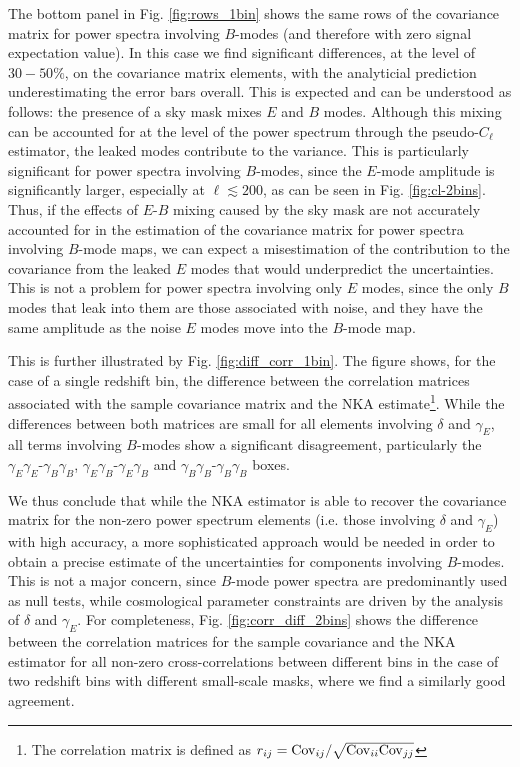 \documentclass[a4paper,11pt]{article}
\begin{document}
      The bottom panel in Fig. \ref{fig:rows_1bin} shows the same rows of the covariance matrix for power spectra involving $B$-modes (and therefore with zero signal expectation value). In this case we find significant differences, at the level of $30-50\%$, on the covariance matrix elements, with the analyticial prediction underestimating the error bars overall. This is expected and can be understood as follows: the presence of a sky mask mixes $E$ and $B$ modes. Although this mixing can be accounted for at the level of the power spectrum through the pseudo-$C_\ell$ estimator, the leaked modes contribute to the variance. This is particularly significant for power spectra involving $B$-modes, since the $E$-mode amplitude is significantly larger, especially at $\ell\lesssim200$, as can be seen in Fig. \ref{fig:cl-2bins}. Thus, if the effects of $E$-$B$ mixing caused by the sky mask are not accurately accounted for in the estimation of the covariance matrix for power spectra involving $B$-mode maps, we can expect a misestimation of the contribution to the covariance from the leaked $E$ modes that would underpredict the uncertainties. This is not a problem for power spectra involving only $E$ modes, since the only $B$ modes that leak into them are those associated with noise, and they have the same amplitude as the noise $E$ modes move into the $B$-mode map.

      This is further illustrated by Fig. \ref{fig:diff_corr_1bin}. The figure shows, for the case of a single redshift bin, the difference between the correlation matrices associated with the sample covariance matrix and the NKA estimate\footnote{The correlation matrix is defined as $r_{ij} = {\rm Cov}_{ij}/\sqrt{{\rm Cov}_{ii}{\rm Cov}_{jj}}$}. While the differences between both matrices are small for all elements involving $\delta$ and $\gamma_E$, all terms involving $B$-modes show a significant disagreement, particularly the  $\gamma_E\gamma_E$-$\gamma_B\gamma_B$, $\gamma_E\gamma_B$-$\gamma_E\gamma_B$ and $\gamma_B\gamma_B$-$\gamma_B\gamma_B$ boxes.

      We thus conclude that while the NKA estimator is able to recover the covariance matrix for the non-zero power spectrum elements (i.e. those involving $\delta$ and $\gamma_E$) with high accuracy, a more sophisticated approach would be needed in order to obtain a precise estimate of the uncertainties for components involving $B$-modes. This is not a major concern, since $B$-mode power spectra are predominantly used as null tests, while cosmological parameter constraints are driven by the analysis of $\delta$ and $\gamma_E$. For completeness, Fig. \ref{fig:corr_diff_2bins} shows the difference between the correlation matrices for the sample covariance and the NKA estimator for all non-zero cross-correlations between different bins in the case of two redshift bins with different small-scale masks, where we find a similarly good agreement.
\end{document}
